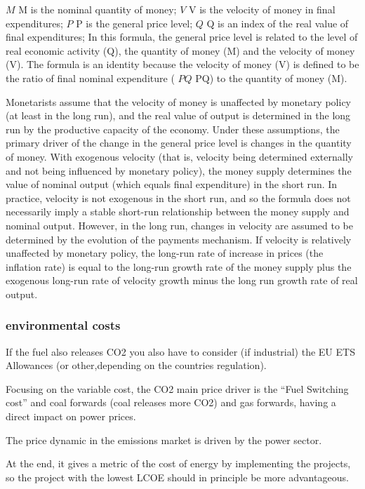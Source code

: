 \documentclass[]{book}
\theoremstyle{definition}
\theoremstyle{definition}
\theoremstyle{definition}
\theoremstyle{remark}
\begin{document}
\({\displaystyle M}\) M is the nominal quantity of money;
\({\displaystyle V}\) V is the velocity of money in final expenditures;
\({\displaystyle P}\) P is the general price level;
\({\displaystyle Q}\) Q is an index of the real value of final
expenditures; In this formula, the general price level is related to the
level of real economic activity (Q), the quantity of money (M) and the
velocity of money (V). The formula is an identity because the velocity
of money (V) is defined to be the ratio of final nominal expenditure (
\({\displaystyle PQ}\) PQ) to the quantity of money (M).

Monetarists assume that the velocity of money is unaffected by monetary
policy (at least in the long run), and the real value of output is
determined in the long run by the productive capacity of the economy.
Under these assumptions, the primary driver of the change in the general
price level is changes in the quantity of money. With exogenous velocity
(that is, velocity being determined externally and not being influenced
by monetary policy), the money supply determines the value of nominal
output (which equals final expenditure) in the short run. In practice,
velocity is not exogenous in the short run, and so the formula does not
necessarily imply a stable short-run relationship between the money
supply and nominal output. However, in the long run, changes in velocity
are assumed to be determined by the evolution of the payments mechanism.
If velocity is relatively unaffected by monetary policy, the long-run
rate of increase in prices (the inflation rate) is equal to the long-run
growth rate of the money supply plus the exogenous long-run rate of
velocity growth minus the long run growth rate of real output.

\subsubsection{environmental costs}\label{environmental-costs}

If the fuel also releases CO2 you also have to consider (if industrial)
the EU ETS Allowances (or other,depending on the countries regulation).

Focusing on the variable cost, the CO2 main price driver is the ``Fuel
Switching cost'' and coal forwards (coal releases more CO2) and gas
forwards, having a direct impact on power prices.

The price dynamic in the emissions market is driven by the power sector.

At the end, it gives a metric of the cost of energy by implementing the
projects, so the project with the lowest LCOE should in principle be
more advantageous.
\end{document}
